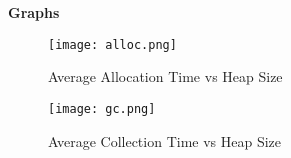 \documentclass[11pt,leqno]{article}
\begin{document}
\textbf{Graphs}
\begin{figure}[H]
	\centering
    	\texttt{[image: alloc.png]}
	\caption{Average Allocation Time vs Heap Size}
	\label{fig:alloct}
\end{figure}

\begin{figure}[H]
	\centering
    	\texttt{[image: gc.png]}
	\caption{Average Collection Time vs Heap Size}
	\label{fig:gct}
\end{figure}
\end{document}
